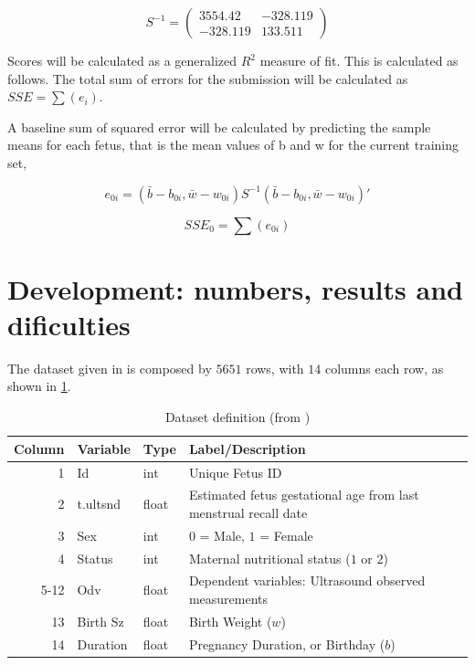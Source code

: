 \documentclass[10pt,twocolumn,letterpaper]{article}
\begin{document}
\begin{equation}
S^{-1} = \left( \begin{array}{cc}
3554.42 & -328.119 \\
-328.119 &  133.511 
\end{array} \right)
\label{eq:S1}
\end{equation}

Scores will be calculated as a generalized $R^2$ measure of fit. This is calculated as follows. The total sum of errors for the submission will be calculated as $SSE = \sum(e_i)$.

A baseline sum of squared error will be calculated by predicting the sample means for each fetus, that is the mean values of b and w for the current training set,

\begin{equation}
e_{0i} = (\bar{b} - b_{0i}, \bar{w} - w_{0i})S^{-1}(\bar{b} - b_{0i}, \bar{w} - w_{0i})' 
\label{eq:e0i}
\end{equation}

$$SSE_0 = \sum(e_{0i})$$

\section{Development: numbers, results and dificulties}

The dataset given in \cite{topcoder} is composed by $5651$ rows, with $14$ columns each row, as shown in \ref{table:definitions}.
\begin{table}
\label{table:definitions}
\begin{center}
\begin{tabular}{rlll}
Column  & Variable  & Type  &  Label/Description \\
\hline
   1    & Id        & int   &  Unique Fetus ID \\
   2    & t.ultsnd  & float &  Estimated fetus gestational age from last menstrual recall date \\
   3    & Sex       & int   &  $0$ = Male, $1$ = Female \\
   4    & Status    & int   &  Maternal nutritional status ($1$ or $2$) \\
 5-12   & Odv       & float &  Dependent variables: Ultrasound observed measurements \\
  13    & Birth Sz  & float &  Birth Weight ($w$) \\
  14    & Duration  & float &  Pregnancy Duration, or Birthday ($b$) \\
\end{tabular} 
\caption {Dataset definition (from \cite{topcoder})}	
\end{center}
\end{table}
\end{document}
